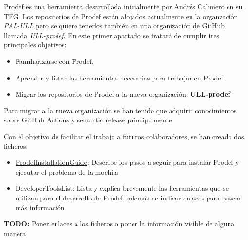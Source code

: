 Prodef es una herramienta desarrollada inicialmente por Andrés Calimero en su TFG. Los repositorios de Prodef están alojados actualmente en la organzación \emph{PAL-ULL} pero se quiere tenerlos también en una organización de GitHub llamada \emph{ULL-prodef}. En este primer apartado se tratará de cumplir tres principales objetivos:

\begin{itemize}
    \item Familiarizarse con Prodef.
    \item Aprender y listar las herramientas necesarias para trabajar en Prodef.
    \item Migrar los repositorios de Prodef a la nueva organización: \textbf{ULL-prodef}
\end{itemize}

Para migrar a la nueva organización se han tenido que adquirir conocimientos sobre GitHub Actions y \href{https://github.com/semantic-release/semantic-release}{semantic release} principalmente

\bigskip
Con el objetivo de facilitar el trabajo a futuros colaboradores, se han creado dos ficheros:
\begin{itemize}
    \item \href{https://github.com/ULL-prodef/prodef/blob/master/INSTALLATION-GUIDE.md}{ProdefInstallationGuide}: Describe los pasos a seguir para instalar Prodef y ejecutar el problema de la mochila
    \item DeveloperToolsList: Lista y explica brevemente las herramientas que se utilizan para el desarrollo de Prodef, además de indicar enlaces para buscar más información
\end{itemize}
\textbf{TODO:} Poner enlaces a los ficheros o poner la información visible de alguna manera


